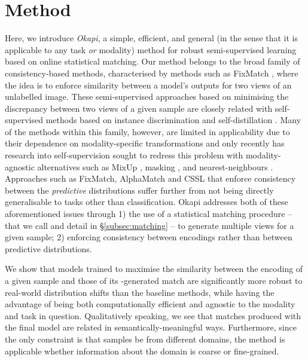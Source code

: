 \section{Method}\label{sec:method}
Here, we introduce \emph{Okapi}, a simple, efficient, and general (in the sense that it is
applicable to any task \emph{or} modality) method for robust semi-supervised learning based on
online statistical matching. 
%
Our method belongs to the broad family of consistency-based methods, characterised by methods such
as FixMatch \citep{sohn2020fixmatch}, where the idea is to enforce similarity between a model's
outputs for two views of an unlabelled image. 
%
These semi-supervised approaches based on minimising the discrepancy between two views of a given
sample are closely related with self-supervised methods based on instance discrimination
\citep{chen2020simple} and self-distillation
\citep{baevski2022data2vec,caron2021emerging,grill2020bootstrap}.
%
Many of the methods within this family, however, are limited in applicability due to their
dependence on modality-specific transformations and only recently has research into
self-supervision sought to redress this problem with modality-agnostic alternatives such as MixUp
\citep{verma2021towards}, masking \citep{baevski2022data2vec}, and nearest-neighbours
\citep{dwibedi2021little, koohpayegani2021mean, van2021revisiting}.
%
Approaches such as FixMatch, AlphaMatch \citep{gong2021alphamatch} and CSSL
\citep{lienen2021credal} that enforce consistency between the \emph{predictive} distributions
suffer further from not being directly generalisable to tasks other than classification.
%
Okapi addresses both of these aforementioned issues through 1) the use of a statistical matching
procedure -- that we call \CNN{} and detail in \S\ref{subsec:matching} -- to generate multiple
views for a given sample; 2) enforcing consistency between encodings rather than between predictive
distributions.

We show that models trained to maximise the similarity between the encoding of a given sample and
those of its \CNN{}-generated match are significantly more robust to real-world distribution shifts
than the baseline methods, while  having the advantage of being both computationally efficient and
agnostic to the modality and task in question.
%
Qualitatively speaking, we see that matches produced with the final model are related in
semantically-meaningful ways. 
%
Furthermore, since the only constraint is that samples be from different domains, the method is
applicable whether information about the domain is coarse or fine-grained.
%

